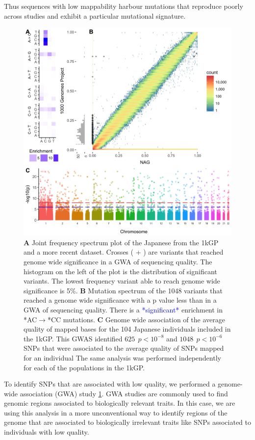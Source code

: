 \documentclass[9pt,lineno]{elife}
\newcommand{\todo}[1]{\textcolor{blue}{*#1*}}
\begin{document}
 Thus sequences with low mappability harbour mutations that reproduce poorly across studies and exhibit a particular mutational signature. 

\begin{figure}
\includegraphics[width=\hsize,keepaspectratio]{Figure1.jpg}
\caption{
\textbf{A} 
Joint frequency spectrum plot of the Japanese from the 1kGP and a more recent dataset.
Crosses ( + ) are variants that reached genome wide significance in a GWA of sequencing quality. 
The histogram on the left of the plot is the distribution of significant variants. 
The lowest frequency variant able to reach genome wide significance is 5\%.
\textbf{B} 
Mutation spectrum of the 1048 variants that reached a genome wide significance with a p value less than in a GWA of sequencing quality. 
There is a \todo{significant} enrichment in *AC${\rightarrow}$*CC mutations. 
\textbf{C} 
Genome wide association of the average quality of mapped bases for the 104 Japanese individuals included in the 1kGP. This GWAS identified $625\ \  p < 10^{-8}$ and $1048\ \ p < 10^{-6}$ SNPs that were associated to the average quality of SNPs mapped for an individual
The same analysis was performed independently for each of the populations in the 1kGP. }
 \label{SFS}
\end{figure}

To identify SNPs that are associated with low quality, we performed a genome-wide association (GWA) study  \ref{SFS}. 
GWA studies are commonly used to find genomic regions associated to biologically relevant traits. In this case, we are using this analysis in a more unconventional way to identify regions of the genome that are associated to biologically irrelevant traits like SNPs associated to individuals with low quality.
 
\end{document}
